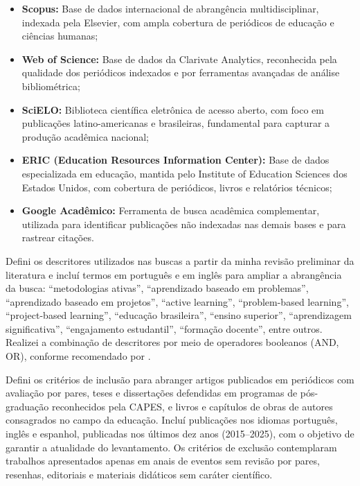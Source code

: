 \begin{itemize}
    \item \textbf{Scopus:} Base de dados internacional de abrangência multidisciplinar, indexada pela Elsevier, com ampla cobertura de periódicos de educação e ciências humanas;
    \item \textbf{Web of Science:} Base de dados da Clarivate Analytics, reconhecida pela qualidade dos periódicos indexados e por ferramentas avançadas de análise bibliométrica;
    \item \textbf{SciELO:} Biblioteca científica eletrônica de acesso aberto, com foco em publicações latino-americanas e brasileiras, fundamental para capturar a produção acadêmica nacional;
    \item \textbf{ERIC (Education Resources Information Center):} Base de dados especializada em educação, mantida pelo Institute of Education Sciences dos Estados Unidos, com cobertura de periódicos, livros e relatórios técnicos;
    \item \textbf{Google Acadêmico:} Ferramenta de busca acadêmica complementar, utilizada para identificar publicações não indexadas nas demais bases e para rastrear citações.
\end{itemize}

Defini os descritores utilizados nas buscas a partir da minha revisão preliminar da literatura e incluí termos em português e em inglês para ampliar a abrangência da busca: ``metodologias ativas'', ``aprendizado baseado em problemas'', ``aprendizado baseado em projetos'', ``active learning'', ``problem-based learning'', ``project-based learning'', ``educação brasileira'', ``ensino superior'', ``aprendizagem significativa'', ``engajamento estudantil'', ``formação docente'', entre outros. Realizei a combinação de descritores por meio de operadores booleanos (AND, OR), conforme recomendado por \cite{BARDIN2016}.

Defini os critérios de inclusão para abranger artigos publicados em periódicos com avaliação por pares, teses e dissertações defendidas em programas de pós-graduação reconhecidos pela CAPES, e livros e capítulos de obras de autores consagrados no campo da educação. Incluí publicações nos idiomas português, inglês e espanhol, publicadas nos últimos dez anos (2015--2025), com o objetivo de garantir a atualidade do levantamento. Os critérios de exclusão contemplaram trabalhos apresentados apenas em anais de eventos sem revisão por pares, resenhas, editoriais e materiais didáticos sem caráter científico.

